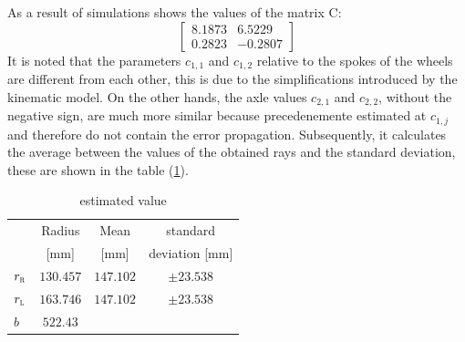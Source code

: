  As a result of simulations shows the values of the matrix C:
\begin{equation}
\label{eq:Cresult}
	\begin{bmatrix}
		8.1873  &  6.5229\\
    	0.2823 &  -0.2807
	\end{bmatrix}
\end{equation}
It is noted that the parameters $c_ {1,1}$ and $c_ {1,2}$ relative to the spokes of the wheels are different from each other, this is due to the simplifications introduced by the kinematic model. On the other hands, the axle values $c_ {2,1}$ and $c_ {2,2}$, without the negative sign, are much more similar because precedenemente estimated at $c_{1,j}$ and therefore do not contain the error propagation.
Subsequently, it calculates the average between the values of the obtained rays and the standard deviation, these are shown in the table (\ref{tab:recapvalue}).
\begin{table}[!h]
\centering
	\begin{tabular}{lccc}
		\hline
								& Radius 	& Mean 	& standard  \\
								&	[mm]	& [mm]	& deviation [mm]\\
		\hline
		$r_\textsc{r}$	&	$130.457$		& $147.102	$		&	$\pm23.538$\\
		$r_\textsc{l}$	&	$163.746$		& $147.102	$		&	$\pm23.538$\\
		$b$					&	$522.43$\\
		\hline
\end{tabular}
\caption{estimated value}
\label{tab:recapvalue}
\end{table}
%
%
